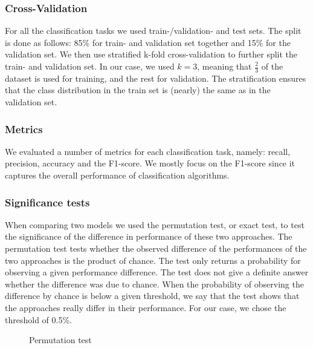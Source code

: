 

\subsubsection{Cross-Validation}
For all the classification tasks we used train-/validation- and test sets.
The split is done as follows: 85\% for train- and validation set together and 15\% for the validation set.
We then use stratified k-fold cross-validation to further split the train- and validation set. In our case, we used $k = 3$, meaning that $\frac{2}{3}$ of the dataset is used for training, and the rest for validation.
The stratification ensures that the class distribution in the train set is (nearly) the same as in the validation set.

\subsubsection{Metrics}
We evaluated a number of metrics for each classification task, namely: 
recall, precision, accuracy and the F1-score. We mostly focus on the F1-score since it captures the overall performance of classification algorithms.

\subsubsection{Significance tests}
When comparing two models we used the permutation test, or exact test, to test the significance of the difference in performance of these two approaches.
The permutation test tests whether the observed difference of the performances of the two approaches is the product of chance.
The test only returns a probability for observing a given performance difference. The test does not give a definite answer whether the difference was due to chance.
When the probability of observing the difference by chance is below a given threshold, we say that the test shows that the approaches really differ in their performance.
For our case, we chose the threshold of 0.5\%.

\begin{figure}[ht]
\centering
{}
\caption{Permutation test}
\end{figure}


